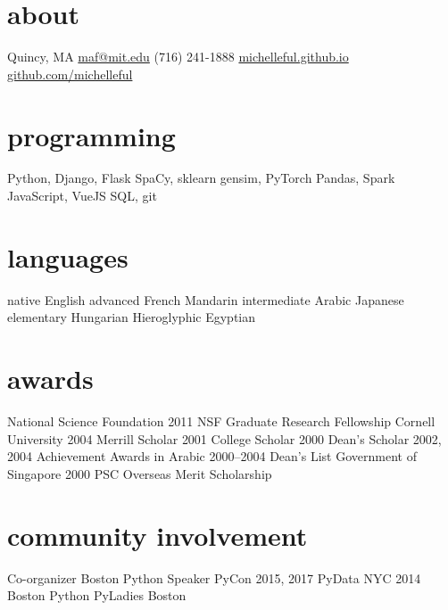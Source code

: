 \documentclass[]{friggeri-cv}
\begin{document}


\begin{aside}
  \section{about}
	Quincy, MA
    \href{mailto:maf@mit.edu}{maf@mit.edu}
    (716) 241-1888
    \href{http://michelleful.github.io}{michelleful.github.io}
    \href{http://github.com/michelleful}{github.com/michelleful}
  \section{programming}
    Python, Django, Flask
    SpaCy, sklearn
    gensim, PyTorch
    Pandas, Spark
    JavaScript, VueJS
	SQL, git
  \section{languages}
	{\footnotesize{}native} English
	{\footnotesize{}advanced} French
	         Mandarin
	{\footnotesize{}intermediate} Arabic
	         Japanese
	{\footnotesize{}elementary} Hungarian
	           Hieroglyphic Egyptian
  \section{awards}
    {\footnotesize{}National Science Foundation}
    {\footnotesize{}2011} NSF Graduate Research Fellowship
    {\footnotesize{}Cornell University} 
    {\footnotesize{}2004} Merrill Scholar
    {\footnotesize{}2001} College Scholar
    {\footnotesize{}2000} Dean's Scholar
    {\footnotesize{}2002, 2004} Achievement Awards in Arabic
    {\footnotesize{}2000--2004} Dean's List
    {\footnotesize{}Government of Singapore}
    {\footnotesize{}2000} PSC Overseas Merit Scholarship 
  \section{community involvement}
    {\footnotesize{}Co-organizer}
    Boston Python
    {\footnotesize{}Speaker}
	PyCon 2015, 2017
	PyData NYC 2014
    Boston Python
    PyLadies Boston
\end{aside}
\end{document}
